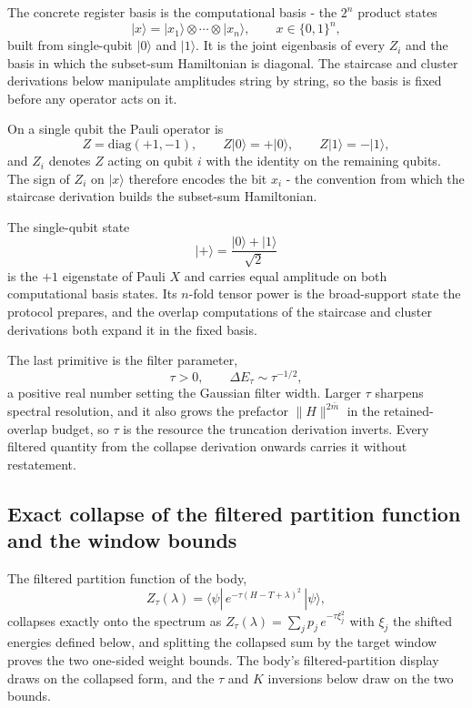 The concrete register basis is the computational basis - the $2^n$ product states
\begin{equation*}
|x\rangle = |x_1\rangle \otimes \cdots \otimes |x_n\rangle , \qquad x \in \{0,1\}^n ,
\end{equation*}
built from single-qubit $|0\rangle$ and $|1\rangle$. It is the joint eigenbasis of every $Z_i$ and the basis in which the subset-sum Hamiltonian is diagonal. The staircase and cluster derivations below manipulate amplitudes string by string, so the basis is fixed before any operator acts on it.

On a single qubit the Pauli operator is
\begin{equation*}
Z = \mathrm{diag}(+1, -1) , \qquad Z|0\rangle = +|0\rangle , \qquad Z|1\rangle = -|1\rangle ,
\end{equation*}
and $Z_i$ denotes $Z$ acting on qubit $i$ with the identity on the remaining qubits. The sign of $Z_i$ on $|x\rangle$ therefore encodes the bit $x_i$ - the convention from which the staircase derivation builds the subset-sum Hamiltonian.

The single-qubit state
\begin{equation*}
|+\rangle = \frac{|0\rangle + |1\rangle}{\sqrt{2}}
\end{equation*}
is the $+1$ eigenstate of Pauli $X$ and carries equal amplitude on both computational basis states. Its $n$-fold tensor power is the broad-support state the protocol prepares, and the overlap computations of the staircase and cluster derivations both expand it in the fixed basis.

The last primitive is the filter parameter,
\begin{equation*}
\tau > 0 , \qquad \Delta E_\tau \sim \tau^{-1/2} ,
\end{equation*}
a positive real number setting the Gaussian filter width. Larger $\tau$ sharpens spectral resolution, and it also grows the prefactor $\|H\|^{2\bar m}$ in the retained-overlap budget, so $\tau$ is the resource the truncation derivation inverts. Every filtered quantity from the collapse derivation onwards carries it without restatement.

\subsection*{Exact collapse of the filtered partition function and the window bounds}

The filtered partition function of the body,
\begin{equation*}
Z_\tau(\lambda) = \langle \psi | \, e^{-\tau (H - T + \lambda)^2} \, | \psi \rangle ,
\end{equation*}
collapses exactly onto the spectrum as $Z_\tau(\lambda) = \sum_j p_j \, e^{-\tau \xi_j^2}$ with $\xi_j$ the shifted energies defined below, and splitting the collapsed sum by the target window proves the two one-sided weight bounds. The body's filtered-partition display draws on the collapsed form, and the $\tau$ and $K$ inversions below draw on the two bounds.


